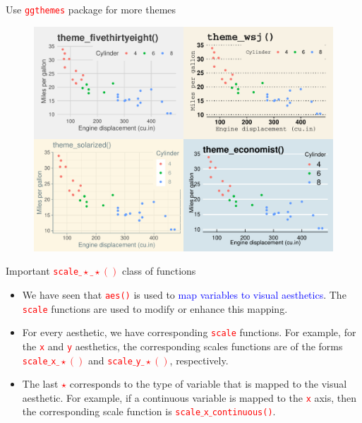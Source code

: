 \documentclass{beamer}
\begin{document}
\begin{frame}{Use \texttt{\textcolor{red}{ggthemes}} package for more themes}
\begin{figure}
\includegraphics[width=0.99\linewidth]{PlotsLec3/InBuiltTheme2}
\end{figure}
\end{frame}

\begin{frame}{Important \texttt{\textcolor{red}{scale$\_\star \_\star()$}} class of functions}
\begin{itemize}
\item We have seen that \texttt{\textcolor{red}{aes()}} is used to \textcolor{blue}{map variables to visual aesthetics}. The \texttt{\textcolor{red}{scale}} functions are used to modify or enhance this mapping.
\vspace{0.3in}
\item<2-> For every aesthetic, we have corresponding \texttt{\textcolor{red}{scale}} functions. For example, for the \texttt{\textcolor{red}{x}} and \texttt{\textcolor{red}{y}} aesthetics, the corresponding scales functions are of the forms \texttt{\textcolor{red}{scale$\_$x$\_\star()$}} and \texttt{\textcolor{red}{scale$\_$y$\_\star()$}}, respectively.
\vspace{0.3in}
\item<3-> The last \textcolor{red}{$\star$} corresponds to the type of variable that is mapped to the visual aesthetic. For example, if a continuous variable is mapped to the \texttt{\textcolor{red}{x}} axis, then the corresponding scale function is \texttt{\textcolor{red}{scale$\_$x$\_$continuous()}}. 
\end{itemize}
\end{frame}
\end{document}

